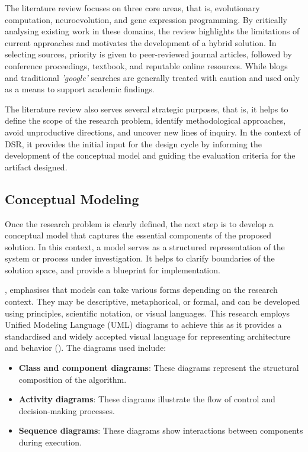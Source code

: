 \parbreak

\noindent The literature review focuses on three core areas, that is, evolutionary computation, neuroevolution, and gene expression programming. By critically analysing existing work in these domains, the review highlights the limitations of current approaches and motivates the development of a hybrid solution. In selecting sources, priority is given to peer-reviewed journal articles, followed by conference proceedings, textbook, and reputable online resources. While blogs and traditional \textit{'google'} searches are generally treated with caution and used only as a means to support academic findings.

\parbreak

\noindent The literature review also serves several strategic purposes, that is, it helps to define the scope of the research problem, identify methodological approaches, avoid unproductive directions, and uncover new lines of inquiry. In the context of DSR, it provides the initial input for the design cycle by informing the development of the conceptual model and guiding the evaluation criteria for the artifact designed.

\subsection{Conceptual Modeling}
Once the research problem is clearly defined, the next step is to develop a conceptual model that captures the essential components of the proposed solution. In this context, a model serves as a structured representation of the system or process under investigation. It helps to clarify boundaries of the solution space, and provide a blueprint for implementation.

\parbreak

\noindent \cite{olivier2009information}, emphasises that models can take various forms depending on the research context. They may be descriptive, metaphorical, or formal, and can be developed using principles, scientific notation, or visual languages. This research employs Unified Modeling Language (UML) diagrams to achieve this as it provides a standardised and widely accepted visual language for representing architecture and behavior (\cite{koc2021uml}). The diagrams used include:
\begin{itemize}
    \item \textbf{Class and component diagrams}: These diagrams represent the structural composition of the algorithm.
    \item \textbf{Activity diagrams}: These diagrams illustrate the flow of control and decision-making processes.
    \item \textbf{Sequence diagrams}: These diagrams show interactions between components during execution.
\end{itemize}

